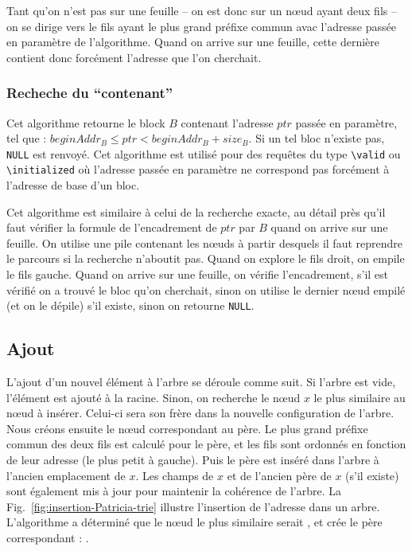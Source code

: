 Tant qu'on n'est pas sur une feuille -- on est donc sur un n\oe{}ud ayant deux
fils
-- on se dirige vers le fils ayant le plus grand préfixe commun avac l'adresse
passée en paramètre de l'algorithme. Quand on arrive sur une feuille, cette
dernière contient donc forcément l'adresse que l'on cherchait.

\subsubsection*{Recheche du ``contenant''}

Cet algorithme retourne le block $B$ contenant l'adresse $ptr$ passée en
paramètre, tel que : $beginAddr_B \le ptr < beginAddr_B + size_B$. Si un tel
bloc n'existe pas, \lstinline{NULL} est renvoyé. Cet algorithme est utilisé pour
des requêtes du type \lstinline{\valid} ou \lstinline{\initialized} où
l'adresse passée en paramètre ne correspond pas forcément à l'adresse de base
d'un bloc.

Cet algorithme est similaire à celui de la recherche exacte, au détail près
qu'il faut vérifier la formule de l'encadrement de $ptr$ par $B$ quand on arrive
sur une feuille. On utilise une pile contenant les n\oe{}uds à partir desquels
il
faut reprendre le parcours si la recherche n'aboutit pas. Quand on explore le
fils droit, on empile le fils gauche. Quand on arrive sur une feuille, on
vérifie l'encadrement, s'il est vérifié on a trouvé le bloc qu'on cherchait,
sinon on utilise le dernier n\oe{}ud empilé (et on le dépile) s'il existe, sinon
on retourne \lstinline{NULL}.

\subsection{Ajout}





L'ajout d'un nouvel élément à l'arbre se déroule comme suit. Si l'arbre est
vide, l'élément est ajouté à la racine. Sinon, on recherche le n\oe{}ud $x$ le
plus
similaire au n\oe{}ud à insérer. Celui-ci sera son frère dans la nouvelle
configuration de l'arbre. Nous créons ensuite le n\oe{}ud correspondant au père.
Le
plus grand préfixe commun des deux fils est calculé pour le père, et les fils
sont ordonnés en fonction de leur adresse (le plus petit à gauche). Puis le
père est inséré dans l'arbre à l'ancien emplacement de $x$. Les champs de $x$ et
de l'ancien père de $x$ (s'il existe) sont également mis à jour pour maintenir
la cohérence de l'arbre. La Fig.~\ref{fig:insertion-Patricia-trie} illustre
l'insertion de l'adresse  dans un arbre.
L'algorithme a déterminé que le n\oe{}ud le plus similaire serait
, et crée
le père correspondant : .


